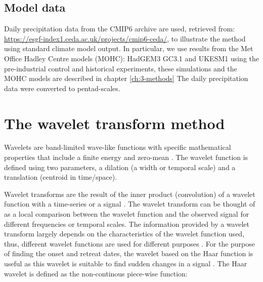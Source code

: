 \subsection{Model data}


Daily precipitation data from the CMIP6 archive are used, retrieved from: \url{https://esgf-index1.ceda.ac.uk/projects/cmip6-ceda/}, to illustrate the method using standard climate model output.
In particular, we use results from the Met Office Hadley Centre models (MOHC): HadGEM3 GC3.1 and UKESM1 using the pre-industrial control and historical experiments, these simulations and the MOHC models are described in chapter \ref{ch:3-methods}
The daily precipitation data were converted to pentad-scales.


\section{The wavelet transform method}


Wavelets are band-limited wave-like functions with specific mathematical properties that include a finite energy and zero-mean \citep{whitcher2000,addison2017}.
The wavelet function is defined using two parameters, a dilation (a width or temporal scale) and a translation (centroid in time/space).

Wavelet transforms are the result of the inner product (convolution) of a wavelet function with  a time-series or a signal \citep{addison2017}. 
The wavelet transform can be thought of as a local comparison between the wavelet function and the observed signal for different frequencies or temporal scales.
The information provided by a wavelet transform largely depends on the characteristics of the wavelet function used, thus, different wavelet functions are used for different purposes \citep{addison2017}. For the purpose of finding the onset and retreat dates, the wavelet based on the Haar function is useful as this wavelet is suitable to find sudden changes in a signal \citep{addison2017}. The Haar wavelet is defined as the non-continous piece-wise function:

